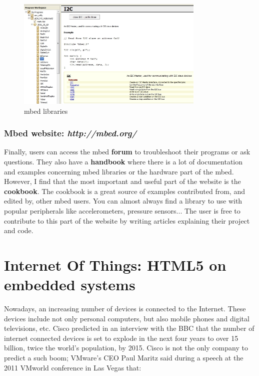 \documentclass[pdftex,10pt,a4paper]{report}
\begin{document}
\begin{figure}[h!]
\centering
\includegraphics[width=0.8\textwidth]{./libraries.jpg}
\caption{mbed libraries}
\label{mbed libraries}
\end{figure}


\subsection{Mbed website: \textit{http://mbed.org/}}
Finally, users can access the mbed \textbf{forum} to troubleshoot their programs or ask questions. They also have a \textbf{handbook} where there is a lot of documentation and examples concerning mbed libraries or the hardware part of the mbed. However, I find that the most important and useful part of the website is the \textbf{cookbook}. The cookbook is a great source of examples contributed from, and edited by, other mbed users. You can almost always find a library to use with popular peripherals like accelerometers, pressure sensors... The user is free to contribute to this part of the website by writing articles explaining their project and code. 

\chapter{Internet Of Things: HTML5 on embedded systems}
Nowadays, an increasing number of devices is connected to the Internet. These devices include not only personal computers, but also mobile phones and digital televisions, etc.
Cisco predicted in an interview with the BBC that the number of internet connected devices is set to explode in the next four years to over 15 billion, twice the world's population, by 2015. Cisco is not the only company to predict a such boom; VMware's CEO Paul Maritz said during a speech at the 2011 VMworld conference in Las Vegas that:
\end{document}
